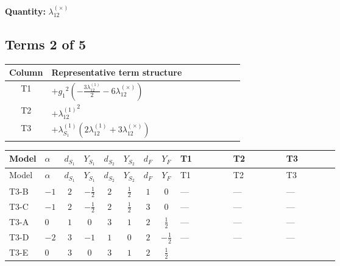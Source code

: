 \documentclass[8pt]{article}
\begin{document}
\begin{landscape}
\begin{longtable}{@{}llcccccc >{\raggedright\arraybackslash}p{0.21\linewidth} >{\raggedright\arraybackslash}p{0.21\linewidth} >{\raggedright\arraybackslash}p{0.21\linewidth}@{}}
\midrule
\bottomrule
\end{longtable}
\clearpage
\noindent\textbf{Quantity: }$\lambda_{12}^{(\times)}$\par\smallskip
\subsection*{Terms 2 of 5}
\begin{center}
\begin{tabular}{@{}c >{\raggedright\arraybackslash}p{0.82\linewidth}@{}}
\toprule
Column & Representative term structure \\
\midrule
T1 & \(\displaystyle +{g_1}^2 \left(-\frac{3 {\lambda_{12}^{(1)}}}{2}-6 {\lambda_{12}^{(\times)}}\right)\) \\
\midrule
T2 & \(\displaystyle +{\lambda_{12}^{(1)}}^2\) \\
\midrule
T3 & \(\displaystyle +{\lambda_{S_1}^{(1)}} (2 {\lambda_{12}^{(1)}}+3 {\lambda_{12}^{(\times)}})\) \\
\midrule
\bottomrule
\end{tabular}
\end{center}
\smallskip
\tiny
\begin{longtable}{@{}llcccccc >{\raggedright\arraybackslash}p{0.21\linewidth} >{\raggedright\arraybackslash}p{0.21\linewidth} >{\raggedright\arraybackslash}p{0.21\linewidth}@{}}
\toprule
Model & $\alpha$ & $d_{S_1}$ & $Y_{S_1}$ & $d_{S_2}$ & $Y_{S_2}$ & $d_F$ & $Y_F$ & T1 & T2 & T3 \\
\midrule
\endfirsthead
\toprule
Model & $\alpha$ & $d_{S_1}$ & $Y_{S_1}$ & $d_{S_2}$ & $Y_{S_2}$ & $d_F$ & $Y_F$ & T1 & T2 & T3 \\
\midrule
\endhead
T3-B & $-1$ & $2$ & $-\frac{1}{2}$ & $2$ & $\frac{1}{2}$ & $1$ & $0$ & --- & --- & --- \\
\midrule
T3-C & $-1$ & $2$ & $-\frac{1}{2}$ & $2$ & $\frac{1}{2}$ & $3$ & $0$ & --- & --- & --- \\
\midrule
T3-A & $0$ & $1$ & $0$ & $3$ & $1$ & $2$ & $\frac{1}{2}$ & --- & --- & --- \\
\midrule
T3-D & $-2$ & $3$ & $-1$ & $1$ & $0$ & $2$ & $-\frac{1}{2}$ & --- & --- & --- \\
\midrule
T3-E & $0$ & $3$ & $0$ & $3$ & $1$ & $2$ & $\frac{1}{2}$ & \scriptsize\adjustbox{max width=\linewidth}{$\begin{gathered} +{g_1}^2 \left(-\frac{3 {\lambda_{12}^{(1)}}}{2}-6 {\lambda_{12}^{(\times)}}\right)\end{gathered}$} & \scriptsize\adjustbox{max width=\linewidth}{$\begin{gathered} +{\lambda_{12}^{(1)}}^2\end{gathered}$} & \scriptsize\adjustbox{max width=\linewidth}{$\begin{gathered} +{\lambda_{S_1}^{(1)}} (2 {\lambda_{12}^{(1)}}+3 {\lambda_{12}^{(\times)}})\end{gathered}$} \\

\end{longtable}
\end{landscape}
\end{document}
